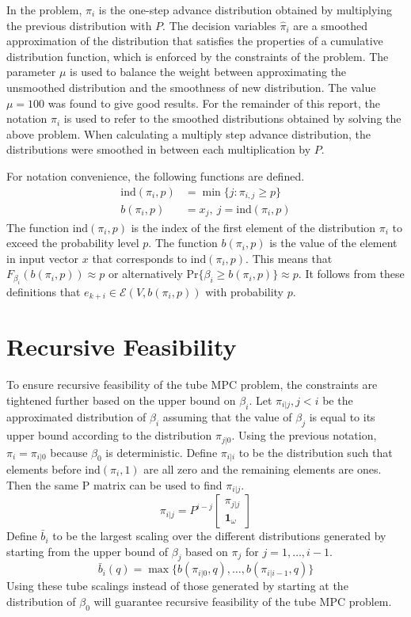 \documentclass[12 pt]{report}
\begin{document}
In the problem, $\pi_i$ is the one-step advance distribution obtained by multiplying the previous distribution with $P$. The decision variables $\hat{\pi}_i$ are a smoothed approximation of the distribution that satisfies the properties of a cumulative distribution function, which is enforced by the constraints of the problem. The parameter $\mu$ is used to balance the weight between approximating the unsmoothed distribution and the smoothness of new distribution. The value $\mu = 100$ was found to give good results. For the remainder of this report, the notation $\pi_i$ is used to refer to the smoothed distributions obtained by solving the above problem. When calculating a multiply step advance distribution, the distributions were smoothed in between each multiplication by $P$.

For notation convenience, the following functions are defined.
\begin{align*}
\mathrm{ind}(\pi_i,p) &= \min\{j:\pi_{i,j} \geq p\} \\
b(\pi_i,p) &= x_j, ~j = \mathrm{ind}(\pi_i, p)
\end{align*}
The function $\mathrm{ind}(\pi_i,p)$ is the index of the first element of the distribution $\pi_i$ to exceed the probability level $p$. The function $b(\pi_i,p)$ is the value of the element in input vector $x$ that corresponds to $\mathrm{ind}(\pi_i,p)$. This means that $F_{\beta_i}(b(\pi_i,p)) \approx p$ or alternatively  $\mathrm{Pr} \{\beta_i \geq b(\pi_i,p) \} \approx p$. It follows from these definitions that $e_{k+i} \in \mathcal{E}(V,b(\pi_i,p))$ with probability $p$.

\section{Recursive Feasibility}
To ensure recursive feasibility of the tube MPC problem, the constraints are tightened further based on the upper bound on $\beta_i$. Let $\pi_{i|j}, j < i$ be the approximated distribution of $\beta_i$ assuming that the value of $\beta_j$ is equal to its upper bound according to the distribution $\pi_{j|0}$. Using the previous notation, $\pi_i = \pi_{i|0}$ because $\beta_0$ is deterministic. Define $\pi_{i|i}$ to be the distribution such that elements before $\mathrm{ind}(\pi_i,1)$ are all zero and the remaining elements are ones. Then the same P matrix can be used to find $\pi_{i|j}$.
$$ \pi_{i|j} = P^{i-j} \begin{bmatrix}
\pi_{j|j} \\ \mathbf{1}_\omega
\end{bmatrix} $$
Define $\bar{b}_i$ to be the largest scaling over the different distributions generated by starting from the upper bound of $\beta_j$ based on $\pi_j$ for $j = 1, \dots, i-1$. $$ \bar{b}_i(q) = \max \{ b(\pi_{i|0},q), \dots, b(\pi_{i|i-1},q) \} $$ Using these tube scalings instead of those generated by starting at the distribution of $\beta_0$ will guarantee recursive feasibility of the tube MPC problem.
\end{document}

